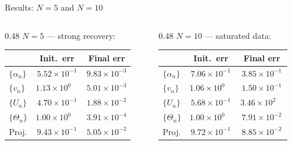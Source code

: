 \documentclass{beamer}
\begin{document}
    \begin{frame}{Results: $N = 5$ and $N = 10$}
        \begin{columns}[T]
            \begin{column}{0.48\textwidth}
                \textbf{$N = 5$} --- strong recovery:
                \vspace{0.2em}

                \small
                \begin{tabular}{@{}lcc@{}}
                    \toprule
                     & Init.\ err & Final err \\
                    \midrule
                    $\{\alpha_n\}$ & $5.52\!\times\!10^{-1}$ & $9.83\!\times\!10^{-3}$ \\
                    $\{v_n\}$      & $1.13\!\times\!10^{0\phantom{-}}$  & $5.01\!\times\!10^{-3}$ \\
                    $\{U_n\}$      & $4.70\!\times\!10^{-1}$ & $1.88\!\times\!10^{-2}$ \\
                    $\{\Theta_n\}$ & $1.00\!\times\!10^{0\phantom{-}}$  & $3.91\!\times\!10^{-4}$ \\
                    Proj.          & $9.43\!\times\!10^{-1}$ & $5.05\!\times\!10^{-2}$ \\
                    \bottomrule
                \end{tabular}
                \normalsize
            \end{column}
            \begin{column}{0.48\textwidth}
                \textbf{$N = 10$} --- saturated data:
                \vspace{0.2em}

                \small
                \begin{tabular}{@{}lcc@{}}
                    \toprule
                     & Init.\ err & Final err \\
                    \midrule
                    $\{\alpha_n\}$ & $7.06\!\times\!10^{-1}$ & $3.85\!\times\!10^{-1}$ \\
                    $\{v_n\}$      & $1.06\!\times\!10^{0\phantom{-}}$  & $1.50\!\times\!10^{-1}$ \\
                    $\{U_n\}$      & $5.68\!\times\!10^{-1}$ & $3.46\!\times\!10^{2\phantom{-}}$ \\
                    $\{\Theta_n\}$ & $1.00\!\times\!10^{0\phantom{-}}$  & $7.91\!\times\!10^{-2}$ \\
                    Proj.          & $9.72\!\times\!10^{-1}$ & $8.85\!\times\!10^{-2}$ \\
                    \bottomrule
                \end{tabular}
                \normalsize
            \end{column}
        \end{columns}


\end{frame}
\end{document}
